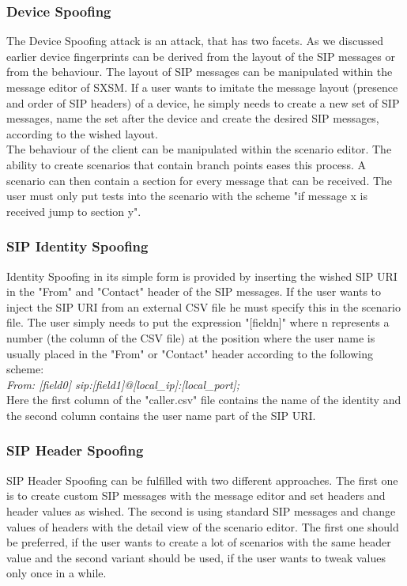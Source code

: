 \documentclass[final
	]{issa}
\begin{document}
\subsubsection{Device Spoofing}
The Device Spoofing attack is an attack, that has two facets. As we discussed earlier device fingerprints can be derived from the layout of the SIP messages or from the behaviour. The layout of SIP messages can be manipulated within the message editor of SXSM. If a user wants to imitate the message layout (presence and order of SIP headers) of a device, he simply needs to create a new set of SIP messages, name the set after the device and create the desired SIP messages, according to the wished layout.\\
The behaviour of the client can be manipulated within the scenario editor. The ability to create scenarios that contain branch points eases this process. A scenario can then contain a section for every message that can be received. The user must only put tests into the scenario with the scheme "if message x is received jump to section y".
\subsubsection{SIP Identity Spoofing}
Identity Spoofing in its simple form is provided by inserting the wished SIP URI in the "From" and "Contact" header of the SIP messages. If the user wants to inject the SIP URI from an external CSV file he must specify this in the scenario file. The user simply needs to put the expression "[fieldn]" where n represents a number (the column of the CSV file) at the position where the user name is usually placed in the "From" or "Contact" header according to the following scheme:\\
\textit{From: [field0] sip:[field1]@[local\_ip]:[local\_port];}\\
Here the first column of the "caller.csv" file contains the name of the identity and the second column contains the user name part of the SIP URI.
\subsubsection{SIP Header Spoofing}
SIP Header Spoofing can be fulfilled with two different approaches. The first one is to create custom SIP messages with the message editor and set headers and header values as wished. The second is using standard SIP messages and change values of headers with the detail view of the scenario editor. The first one should be preferred, if the user wants to create a lot of scenarios with the same header value and the second variant should be used, if the user wants to tweak values only once in a while.
\end{document}
